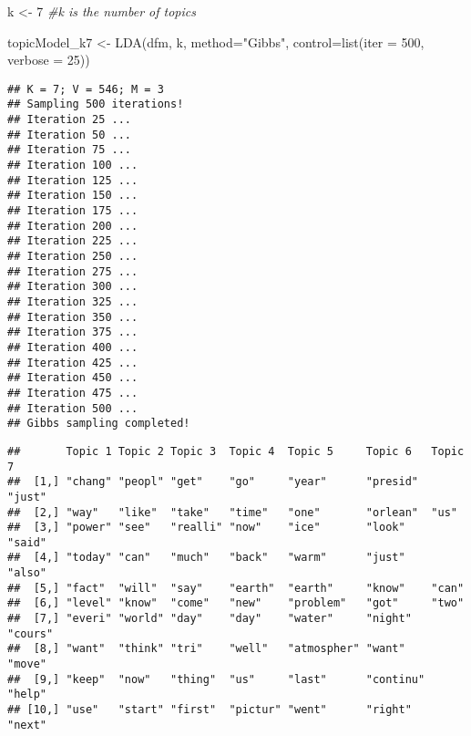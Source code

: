 \documentclass[
]{article}
\newenvironment{Shaded}{\begin{snugshade}}{\end{snugshade}}
\newcommand{\AttributeTok}[1]{\textcolor[rgb]{0.77,0.63,0.00}{#1}}
\newcommand{\CommentTok}[1]{\textcolor[rgb]{0.56,0.35,0.01}{\textit{#1}}}
\newcommand{\DecValTok}[1]{\textcolor[rgb]{0.00,0.00,0.81}{#1}}
\newcommand{\FunctionTok}[1]{\textcolor[rgb]{0.00,0.00,0.00}{#1}}
\newcommand{\NormalTok}[1]{#1}
\newcommand{\OtherTok}[1]{\textcolor[rgb]{0.56,0.35,0.01}{#1}}
\newcommand{\SpecialCharTok}[1]{\textcolor[rgb]{0.00,0.00,0.00}{#1}}
\newcommand{\StringTok}[1]{\textcolor[rgb]{0.31,0.60,0.02}{#1}}
\begin{document}
\begin{Shaded}
\begin{Highlighting}[]
\NormalTok{k }\OtherTok{\textless{}{-}} \DecValTok{7} \CommentTok{\#k is the number of topics}

\NormalTok{topicModel\_k7 }\OtherTok{\textless{}{-}} \FunctionTok{LDA}\NormalTok{(dfm, }
\NormalTok{                     k, }
                     \AttributeTok{method=}\StringTok{"Gibbs"}\NormalTok{, }
                     \AttributeTok{control=}\FunctionTok{list}\NormalTok{(}\AttributeTok{iter =} \DecValTok{500}\NormalTok{, }\AttributeTok{verbose =} \DecValTok{25}\NormalTok{))}
\end{Highlighting}
\end{Shaded}

\begin{verbatim}
## K = 7; V = 546; M = 3
## Sampling 500 iterations!
## Iteration 25 ...
## Iteration 50 ...
## Iteration 75 ...
## Iteration 100 ...
## Iteration 125 ...
## Iteration 150 ...
## Iteration 175 ...
## Iteration 200 ...
## Iteration 225 ...
## Iteration 250 ...
## Iteration 275 ...
## Iteration 300 ...
## Iteration 325 ...
## Iteration 350 ...
## Iteration 375 ...
## Iteration 400 ...
## Iteration 425 ...
## Iteration 450 ...
## Iteration 475 ...
## Iteration 500 ...
## Gibbs sampling completed!
\end{verbatim}

\begin{Shaded}
\end{Shaded}

\begin{verbatim}
##       Topic 1 Topic 2 Topic 3  Topic 4  Topic 5     Topic 6   Topic 7
##  [1,] "chang" "peopl" "get"    "go"     "year"      "presid"  "just" 
##  [2,] "way"   "like"  "take"   "time"   "one"       "orlean"  "us"   
##  [3,] "power" "see"   "realli" "now"    "ice"       "look"    "said" 
##  [4,] "today" "can"   "much"   "back"   "warm"      "just"    "also" 
##  [5,] "fact"  "will"  "say"    "earth"  "earth"     "know"    "can"  
##  [6,] "level" "know"  "come"   "new"    "problem"   "got"     "two"  
##  [7,] "everi" "world" "day"    "day"    "water"     "night"   "cours"
##  [8,] "want"  "think" "tri"    "well"   "atmospher" "want"    "move" 
##  [9,] "keep"  "now"   "thing"  "us"     "last"      "continu" "help" 
## [10,] "use"   "start" "first"  "pictur" "went"      "right"   "next"
\end{verbatim}
\end{document}
